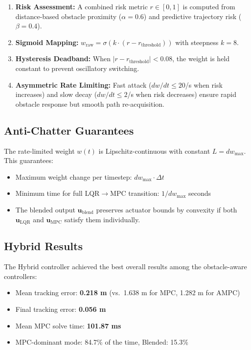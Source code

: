 \documentclass[12pt, a4paper]{article}
\begin{document}
\begin{enumerate}
    \item \textbf{Risk Assessment:} A combined risk metric $r \in [0,1]$ is computed from distance-based obstacle proximity ($\alpha = 0.6$) and predictive trajectory risk ($\beta = 0.4$).
    \item \textbf{Sigmoid Mapping:} $w_{\text{raw}} = \sigma(k \cdot (r - r_{\text{threshold}}))$ with steepness $k = 8$.
    \item \textbf{Hysteresis Deadband:} When $|r - r_{\text{threshold}}| < 0.08$, the weight is held constant to prevent oscillatory switching.
    \item \textbf{Asymmetric Rate Limiting:} Fast attack ($dw/dt \leq 20$/s when risk increases) and slow decay ($dw/dt \leq 2$/s when risk decreases) ensure rapid obstacle response but smooth path re-acquisition.
\end{enumerate}

\subsection{Anti-Chatter Guarantees}
The rate-limited weight $w(t)$ is Lipschitz-continuous with constant $L = dw_{\max}$. This guarantees:
\begin{itemize}
    \item Maximum weight change per timestep: $dw_{\max} \cdot \Delta t$
    \item Minimum time for full LQR$\to$MPC transition: $1/dw_{\max}$ seconds
    \item The blended output $\mathbf{u}_{\text{blend}}$ preserves actuator bounds by convexity if both $\mathbf{u}_{\text{LQR}}$ and $\mathbf{u}_{\text{MPC}}$ satisfy them individually.
\end{itemize}

\subsection{Hybrid Results}
The Hybrid controller achieved the best overall results among the obstacle-aware controllers:
\begin{itemize}
    \item Mean tracking error: \textbf{0.218 m} (vs.\ 1.638 m for MPC, 1.282 m for AMPC)
    \item Final tracking error: \textbf{0.056 m}
    \item Mean MPC solve time: \textbf{101.87 ms}
    \item MPC-dominant mode: 84.7\% of the time, Blended: 15.3\%
\end{itemize}
\end{document}
